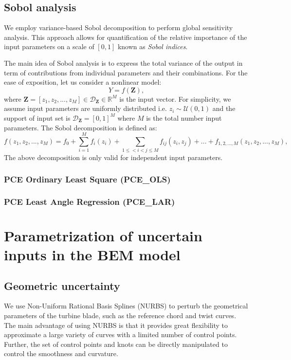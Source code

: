 \documentclass[review]{elsarticle}
\numberwithin{equation}{section}
\numberwithin{equation}{section}
\begin{document}
\subsection{Sobol analysis}
We employ variance-based Sobol decomposition to perform global sensitivity analysis. This approach allows for quantification of  the relative importance of the input parameters on a scale of $[0,1]$ known as \emph{Sobol indices}. 

The main idea of Sobol analysis is to express the total variance of the output in term of contributions from individual parameters and their combinations. For the ease of exposition, let us consider a nonlinear model:
\begin{equation}\label{nonlinear_model}
Y = f(\mathbf{Z}),
\end{equation}
where $\mathbf{Z} = [z_1, z_2, ..., z_M]\in \mathcal{D}_{\mathbf{Z}}\in \mathbb{R}^M$ is the input vector. For simplicity, we assume input parameters are uniformly distributed i.e. $z_i \sim \mathcal{U}(0,1)$ and the support of input set is $\mathcal{D}_\mathbf{Z}  =  [0,1]^M$ where $M$ is the total number input parameters. The Sobol decomposition is defined as:
\begin{equation}\label{sobol_decomp}
f(z_1, z_2, ..., z_M) = f_0+\sum_{i=1}^M f_i(z_i) + \sum_{1\leq<i<j\leq M} f_{ij}(z_i,z_j) + ... + f_{1, 2, ..., M}(z_1, z_2, ..., z_M),
\end{equation}
The above decomposition is only valid for independent input parameters. 
\subsubsection{PCE Ordinary Least Square (PCE\_OLS)}
\subsubsection{PCE Least Angle Regression (PCE\_LAR)}
\section{Parametrization of uncertain inputs in the BEM model}
\subsection{Geometric uncertainty}
We use Non-Uniform Rational Basis Splines (NURBS) \cite{rogers2000} to perturb the geometrical parameters of the turbine blade, such as the reference chord and twist curves. The main advantage of using NURBS is that it provides great flexibility to approximate a large variety of curves with a limited number of control points. Further, the set of control points and knots can be directly manipulated to control the smoothness and curvature.
\end{document}
